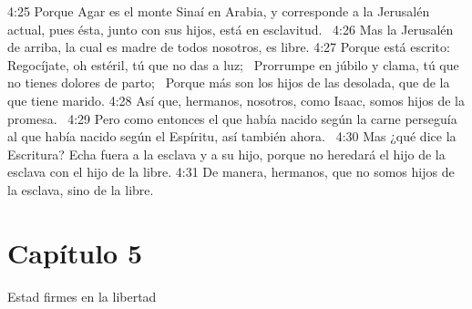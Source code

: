 4:25 Porque Agar es el monte Sinaí en Arabia, y corresponde a la Jerusalén actual, pues ésta, junto con sus hijos, está en esclavitud.  
4:26 Mas la Jerusalén de arriba, la cual es madre de todos nosotros, es libre. 
4:27 Porque está escrito:  
Regocíjate, oh estéril, tú que no das a luz;  
Prorrumpe en júbilo y clama, tú que no tienes dolores de parto;  
Porque más son los hijos de las desolada, que de la que tiene marido. 
4:28 Así que, hermanos, nosotros, como Isaac, somos hijos de la promesa.  
4:29 Pero como entonces el que había nacido según la carne perseguía al que había nacido según el Espíritu, así también ahora.  
4:30 Mas ¿qué dice la Escritura? Echa fuera a la esclava y a su hijo, porque no heredará el hijo de la esclava con el hijo de la libre. 
4:31 De manera, hermanos, que no somos hijos de la esclava, sino de la libre.  
\section*{Capítulo 5}
Estad firmes en la libertad  

